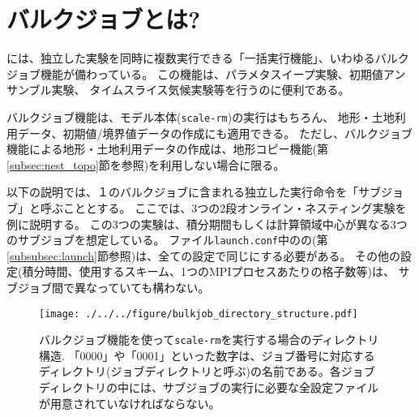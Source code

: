 
\section{バルクジョブとは?} \label{sec:bulkjob}
\scalerm には、独立した実験を同時に複数実行できる「一括実行機能」、いわゆるバルクジョブ機能が備わっている。
この機能は、パラメタスイープ実験、初期値アンサンブル実験、
タイムスライス気候実験等を行うのに便利である。

バルクジョブ機能は、モデル本体(\verb|scale-rm|)の実行はもちろん、
地形・土地利用データ、初期値/境界値データの作成にも適用できる。
ただし、バルクジョブ機能による地形・土地利用データの作成は、地形コピー機能(第\ref{subsec:nest_topo}節を参照)を利用しない場合に限る。

以下の説明では、１のバルクジョブに含まれる独立した実行命令を「サブジョブ」と呼ぶこととする。
ここでは、3つの2段オンライン・ネスティング実験を例に説明する。
この3つの実験は、積分期間もしくは計算領域中心が異なる3つのサブジョブを想定している。
ファイル\verb|launch.conf|中のの(第\ref{subsubsec:launch}節参照)は、全ての設定で同じにする必要がある。
その他の設定(積分時間、使用するスキーム、1つのMPIプロセスあたりの格子数等)は、
サブジョブ間で異なっていても構わない。

\begin{figure}[t]
\begin{center}
  \texttt{[image: ./../../figure/bulkjob\_directory\_structure.pdf]}\\
  \caption{バルクジョブ機能を使って\texttt{scale-rm}を実行する場合のディレクトリ構造. 「0000」や「0001」といった数字は、ジョブ番号に対応するディレクトリ(ジョブディレクトリと呼ぶ)の名前である。各ジョブディレクトリの中には、サブジョブの実行に必要な全設定ファイルが用意されていなければならない。}
  \label{fig_bulkjob}
\end{center}
\end{figure}


